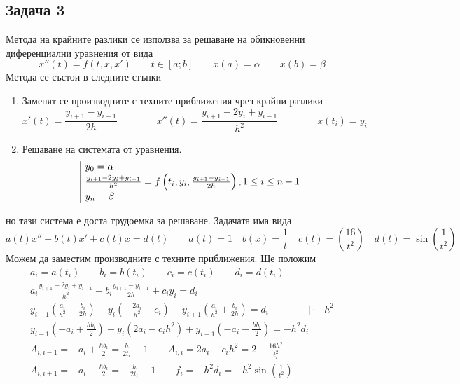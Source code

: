\documentclass[a4paper,fleqn,12pt]{article}
\begin{document}
\subsection{Задача 3}
Метода на крайните разлики се използва за решаване на обикновенни диференциални уравнения от вида 
\begin{equation*}
	x''(t)=f(t,x,x') \qquad t \in [a;b] \qquad x(a) = \alpha \qquad x(b) = \beta
\end{equation*}
Метода се състои в следните стъпки
\begin{enumerate}
\item Заменят се производните с техните приближения чрез крайни разлики
	\begin{equation*}
	x'(t) = \frac{y_{i+1} - y_{i-1}}{2h} \qquad \qquad x''(t) = \frac{y_{i+1} - 2y_i + y_{i-1}}{h^2} \qquad \qquad x(t_i) = y_i
	\end{equation*}
\item Решаване на системата от уравнения.
	\begin{equation*}
		\begin{array}{|l@{}}
			y_0 = \alpha\\ 
			\frac{y_{i+1} - 2y_i + y_{i-1}}{h^2} =  f \left(t_i, y_i, \frac{y_{i+1} - y_{i-1}}{2h}\right),  1\leq i \leq n-1 \\
			y_n = \beta
		\end{array}
	\end{equation*}
\end{enumerate}
но тази система е доста трудоемка за решаване. Задачата има вида
	\begin{equation*}
	a(t)x'' + b(t)x'+c(t)x=d(t) \qquad a(t) = 1 \quad  b(x) = \frac{1}{t} \quad  c(t) = \left( \frac{16}{t^2}\right) 
\quad d(t) = \sin \left( \frac{1}{t^2}\right)
	\end{equation*}
Можем да заместим производните с техните приближения. Ще положим 
	\begin{gather*}
	a_i = a(t_i) \qquad b_i = b(t_i) \qquad c_i = c(t_i) \qquad d_i = d(t_i) \\
	a_i \frac{y_{i+1} - 2y_i + y_{i-1}}{h^2} + b_i \frac{y_{i+1} - y_{i-1}}{2h} + c_i y_i = d_i \\
	y_{i-1} \left(\frac{a_i}{h^2} - \frac{b_i}{2h} \right) + 
	y_i \left( - \frac{2a_i}{h^2} + c_i \right) + 
	y_{i+1}\left(\frac{a_i}{h^2} + \frac{b_i}{2h} \right) = d_i \qquad \qquad \Big| \cdot -h^2 \\
	y_{i-1} \left(-a_i + \frac{hb_i}{2} \right) + 
	y_i \left(2a_i - c_i h^2 \right) + 
	y_{i+1} \left(-a_i - \frac{hb_i}{2} \right) = -h^2 d_i \\
	A_{i,i-1} = -a_i + \frac{hb_i}{2} = \frac{h}{2t_i} - 1 \qquad 
	A_{i,i} = 2a_i - c_i h^2  = 2-\frac{16h^2}{t_i ^2} \\
	A_{i,i+1} = -a_i - \frac{hb_i}{2} = - \frac{h}{2t_i} - 1 \qquad 
	f_i = -h^2 d_i = -h^2 \sin \left( \frac{1}{t^2}\right)
	\end{gather*}
\newpage
\end{document}
